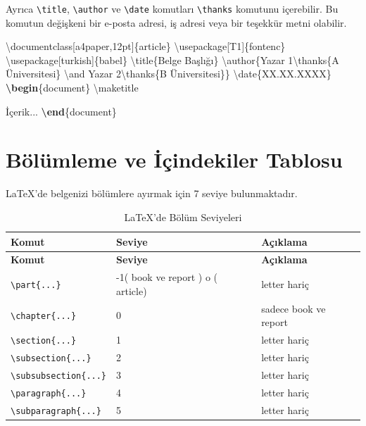 \documentclass[
  10pt,
]{scrbook}
\newenvironment{Shaded}{}{}
\newcommand{\BuiltInTok}[1]{#1}
\newcommand{\ExtensionTok}[1]{#1}
\newcommand{\FunctionTok}[1]{\textcolor[rgb]{0.02,0.16,0.49}{#1}}
\newcommand{\KeywordTok}[1]{\textcolor[rgb]{0.00,0.44,0.13}{\textbf{#1}}}
\newcommand{\NormalTok}[1]{#1}
\theoremstyle{definition}
\theoremstyle{definition}
\theoremstyle{definition}
\theoremstyle{definition}
\theoremstyle{remark}
\begin{document}
Ayrıca \texttt{\textbackslash{}title}, \texttt{\textbackslash{}author} ve \texttt{\textbackslash{}date} komutları \texttt{\textbackslash{}thanks} komutunu içerebilir. Bu komutun değişkeni bir e-posta adresi, iş adresi veya bir teşekkür metni olabilir.

\begin{Shaded}
\begin{Highlighting}[]
\BuiltInTok{\textbackslash{}documentclass}\NormalTok{[a4paper,12pt]\{}\ExtensionTok{article}\NormalTok{\}}
\BuiltInTok{\textbackslash{}usepackage}\NormalTok{[T1]\{}\ExtensionTok{fontenc}\NormalTok{\}}
\BuiltInTok{\textbackslash{}usepackage}\NormalTok{[turkish]\{}\ExtensionTok{babel}\NormalTok{\}}
\FunctionTok{\textbackslash{}title}\NormalTok{\{Belge Başlığı\}}
\FunctionTok{\textbackslash{}author}\NormalTok{\{Yazar 1}\FunctionTok{\textbackslash{}thanks}\NormalTok{\{A Üniversitesi\} }\FunctionTok{\textbackslash{}and}\NormalTok{ Yazar 2}\FunctionTok{\textbackslash{}thanks}\NormalTok{\{B Üniversitesi\}\}}
\FunctionTok{\textbackslash{}date}\NormalTok{\{XX.XX.XXXX\}}
\KeywordTok{\textbackslash{}begin}\NormalTok{\{}\ExtensionTok{document}\NormalTok{\}}
\FunctionTok{\textbackslash{}maketitle}

\NormalTok{  İçerik...}
\KeywordTok{\textbackslash{}end}\NormalTok{\{}\ExtensionTok{document}\NormalTok{\}}
\end{Highlighting}
\end{Shaded}

\hypertarget{buxf6luxfcmleme-ve-iuxe7indekiler-tablosu}{%
\section{Bölümleme ve İçindekiler Tablosu}\label{buxf6luxfcmleme-ve-iuxe7indekiler-tablosu}}

LaTeX'de belgenizi bölümlere ayırmak için 7 seviye bulunmaktadır.

\begin{longtable}[]{@{}lll@{}}
\caption{\label{tab:bolsev} LaTeX'de Bölüm Seviyeleri}\tabularnewline
\toprule
\textbf{Komut} & \textbf{Seviye} & \textbf{Açıklama} \\
\midrule
\endfirsthead
\toprule
\textbf{Komut} & \textbf{Seviye} & \textbf{Açıklama} \\
\midrule
\endhead
\texttt{\textbackslash{}part\{...\}} & -1( book ve report ) o ( article) & letter hariç \\
\texttt{\textbackslash{}chapter\{...\}} & 0 & sadece book ve report \\
\texttt{\textbackslash{}section\{...\}} & 1 & letter hariç \\
\texttt{\textbackslash{}subsection\{...\}} & 2 & letter hariç \\
\texttt{\textbackslash{}subsubsection\{...\}} & 3 & letter hariç \\
\texttt{\textbackslash{}paragraph\{...\}} & 4 & letter hariç \\
\texttt{\textbackslash{}subparagraph\{...\}} & 5 & letter hariç \\
\bottomrule
\end{longtable}
\end{document}
